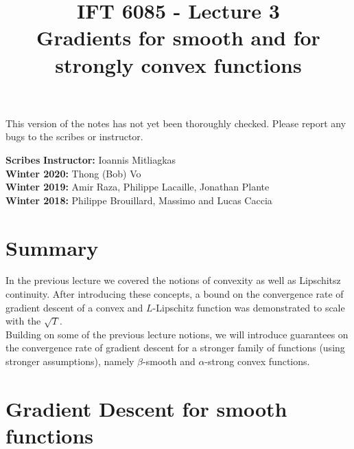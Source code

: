 \documentclass{article}
\title{IFT 6085 - Lecture 3 \\ 
Gradients for smooth and for strongly convex functions}
\date{}
\begin{document}
 

\maketitle

\vspace{-0.5in}
\begin{center}
This version of the notes has not yet been thoroughly checked.
Please report any bugs to the scribes or instructor.
\end{center}
\vspace{0.2in}

\textbf{Scribes}\hfill
\textbf{Instructor:}  Ioannis Mitliagkas\\
\textbf{Winter 2020:} Thong (Bob) Vo\\
\textbf{Winter 2019:} Amir Raza, Philippe Lacaille, Jonathan Plante\\
\textbf{Winter 2018:} Philippe Brouillard, Massimo and Lucas Caccia



\newcommand{\infgc}{\inf_{g \in \mathcal{C}}}
\newcommand{\supgc}{\sup_{g \in \mathcal{C}}}

\newcommand{\Prob}{\mathbb{P}}
\newcommand{\reals}{\mathbb{R}}

\section{Summary}

In the previous lecture we covered the notions of convexity as well as Lipschitsz continuity. After introducing these concepts, a bound on the convergence rate of gradient descent of a convex and $L$-Lipschitz function was demonstrated to scale with the $\sqrt{T}$.
\\

Building on some of the previous lecture notions, we will introduce guarantees on the convergence rate of gradient descent for a stronger family of functions (using stronger assumptions), namely $\beta$-smooth and $\alpha$-strong convex functions.
\\

\section{Gradient Descent for smooth functions}
\end{document}
